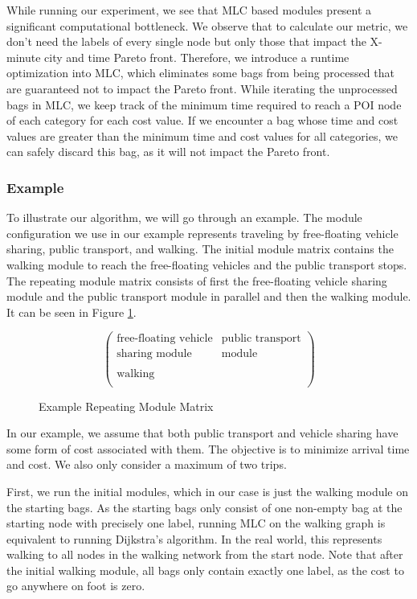 While running our experiment, we see that MLC based modules present a significant computational bottleneck.
We observe that to calculate our metric, we don't need the labels of every single node but only those that impact the X-minute city and time Pareto front.
Therefore, we introduce a runtime optimization into MLC, which eliminates some bags from being processed that are guaranteed not to impact the Pareto front.
While iterating the unprocessed bags in MLC, we keep track of the minimum time required to reach a POI node of each category for each cost value.
If we encounter a bag whose time and cost values are greater than the minimum time and cost values for all categories, we can safely discard this bag, as it will not impact the Pareto front.


\subsubsection{Example}
\label{subsubsec:example}

To illustrate our algorithm, we will go through an example.
The module configuration we use in our example represents traveling by free-floating vehicle sharing, public transport, and walking.
The initial module matrix contains the walking module to reach the free-floating vehicles and the public transport stops.
The repeating module matrix consists of first the free-floating vehicle sharing module and the public transport module in parallel and then the walking module.
It can be seen in Figure \ref{fig:example_module_matrix}.


\begin{figure}[ht]
\centering
\[
\begin{pmatrix}
\text{free-floating vehicle} & \text{public transport} \\
\text{sharing module} & \text{module} \\
\\
\text{walking} & \\
\end{pmatrix}
\]
\caption{Example Repeating Module Matrix}
\label{fig:example_module_matrix}
\end{figure}

In our example, we assume that both public transport and vehicle sharing have some form of cost associated with them.
The objective is to minimize arrival time and cost.
We also only consider a maximum of two trips.

First, we run the initial modules, which in our case is just the walking module on the starting bags.
As the starting bags only consist of one non-empty bag at the starting node with precisely one label, running MLC on the walking graph is equivalent to running Dijkstra's algorithm.
In the real world, this represents walking to all nodes in the walking network from the start node.
Note that after the initial walking module, all bags only contain exactly one label, as the cost to go anywhere on foot is zero.

